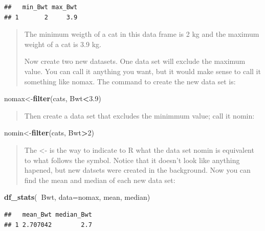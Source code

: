 \documentclass[]{book}
\newenvironment{Shaded}{\begin{snugshade}}{\end{snugshade}}
\newcommand{\DataTypeTok}[1]{\textcolor[rgb]{0.13,0.29,0.53}{#1}}
\newcommand{\DecValTok}[1]{\textcolor[rgb]{0.00,0.00,0.81}{#1}}
\newcommand{\FloatTok}[1]{\textcolor[rgb]{0.00,0.00,0.81}{#1}}
\newcommand{\KeywordTok}[1]{\textcolor[rgb]{0.13,0.29,0.53}{\textbf{#1}}}
\newcommand{\NormalTok}[1]{#1}
\newcommand{\OperatorTok}[1]{\textcolor[rgb]{0.81,0.36,0.00}{\textbf{#1}}}
\begin{document}
\begin{verbatim}
##   min_Bwt max_Bwt
## 1       2     3.9
\end{verbatim}

\begin{quote}
The minimum weigth of a cat in this data frame is 2 kg and the maximum weight of a cat is 3.9 kg.

Now create two new datasets. One data set will exclude the maximum value. You can call it anything you want, but it would make sense to call it something like nomax. The command to create the new data set is:
\end{quote}

\begin{Shaded}
\begin{Highlighting}[]
\NormalTok{nomax<-}\KeywordTok{filter}\NormalTok{(cats, Bwt}\OperatorTok{<}\FloatTok{3.9}\NormalTok{)}
\end{Highlighting}
\end{Shaded}

\begin{quote}
Then create a data set that excludes the minimmum value; call it nomin:
\end{quote}

\begin{Shaded}
\begin{Highlighting}[]
\NormalTok{nomin<-}\KeywordTok{filter}\NormalTok{(cats, Bwt}\OperatorTok{>}\DecValTok{2}\NormalTok{)}
\end{Highlighting}
\end{Shaded}

\begin{quote}
The \textless{}- is the way to indicate to R what the data set nomin is equivalent to what follows the symbol. Notice that it doesn't look like anything hapened, but new datsets were created in the background. Now you can find the mean and median of each new data set:
\end{quote}

\begin{Shaded}
\begin{Highlighting}[]
\KeywordTok{df_stats}\NormalTok{(}\OperatorTok{~}\NormalTok{Bwt, }\DataTypeTok{data=}\NormalTok{nomax, mean, median)}
\end{Highlighting}
\end{Shaded}

\begin{verbatim}
##   mean_Bwt median_Bwt
## 1 2.707042        2.7
\end{verbatim}
\end{document}
